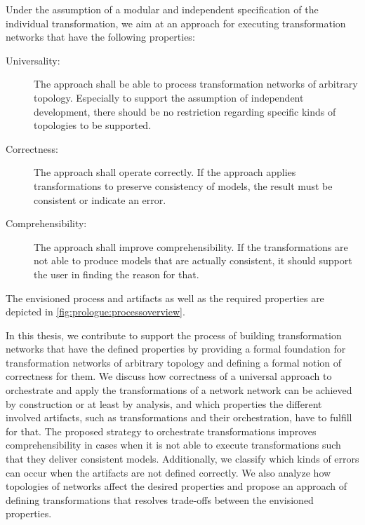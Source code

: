 Under the assumption of a modular and independent specification of the individual transformation, we aim at an approach for executing transformation networks that have the following properties:
\begin{description}
    \item[Universality:] The approach shall be able to process transformation networks of arbitrary topology. Especially to support the assumption of independent development, there should be no restriction regarding specific kinds of topologies to be supported.
    \item[Correctness:] The approach shall operate correctly. If the approach applies transformations to preserve consistency of models, the result must be consistent or indicate an error.
    \item[Comprehensibility:] The approach shall improve comprehensibility. If the transformations are not able to produce models that are actually consistent, it should support the user in finding the reason for that.
\end{description}
The envisioned process and artifacts as well as the required properties are depicted in \autoref{fig:prologue:processoverview}.

In this thesis, we contribute to support the process of building transformation networks that have the defined properties by providing a formal foundation for transformation networks of arbitrary topology and defining a formal notion of correctness for them.
We discuss how correctness of a universal approach to orchestrate and apply the transformations of a network network can be achieved by construction or at least by analysis, and which properties the different involved artifacts, such as transformations and their orchestration, have to fulfill for that.
The proposed strategy to orchestrate transformations improves comprehensibility in cases when it is not able to execute transformations such that they deliver consistent models.
Additionally, we classify which kinds of errors can occur when the artifacts are not defined correctly.
We also analyze how topologies of networks affect the desired properties and propose an approach of defining transformations that resolves trade-offs between the envisioned properties.

